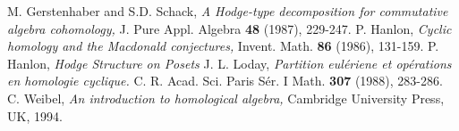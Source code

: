 \documentclass{amsart}
\begin{document}
\begin{thebibliography}{9}
  M. Gerstenhaber and S.D. Schack,
  \emph{A Hodge-type decomposition for commutative algebra cohomology,}
  J. Pure Appl. Algebra {\bf 48} (1987), 229-247.
  P. Hanlon,
  \emph{Cyclic homology and the Macdonald conjectures,}
  Invent. Math. {\bf 86} (1986), 131-159.
  P. Hanlon,
  \emph{Hodge Structure on Posets}
  J. L. Loday,
  \emph{Partition eul\'eriene et op\'erations en homologie cyclique.}
  C. R. Acad. Sci. Paris S\'er. I Math. {\bf 307} (1988), 283-286.
  C. Weibel,
  \emph{An introduction to homological algebra,}
  Cambridge University Press, UK, 1994.

\end{thebibliography}
\end{document}
